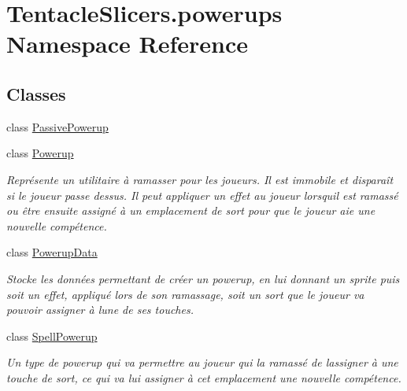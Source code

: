 \hypertarget{namespace_tentacle_slicers_1_1powerups}{}\section{Tentacle\+Slicers.\+powerups Namespace Reference}
\label{namespace_tentacle_slicers_1_1powerups}
\subsection*{Classes}
\begin{DoxyCompactItemize}
\item 
class \hyperlink{class_tentacle_slicers_1_1powerups_1_1_passive_powerup}{Passive\+Powerup}
\item 
class \hyperlink{class_tentacle_slicers_1_1powerups_1_1_powerup}{Powerup}
\begin{DoxyCompactList}\small\item\em Représente un utilitaire à ramasser pour les joueurs. Il est immobile et disparaît si le joueur passe dessus. Il peut appliquer un effet au joueur lorsqu\textquotesingle{}il est ramassé ou être ensuite assigné à un emplacement de sort pour que le joueur aie une nouvelle compétence. \end{DoxyCompactList}\item 
class \hyperlink{class_tentacle_slicers_1_1powerups_1_1_powerup_data}{Powerup\+Data}
\begin{DoxyCompactList}\small\item\em Stocke les données permettant de créer un powerup, en lui donnant un sprite puis soit un effet, appliqué lors de son ramassage, soit un sort que le joueur va pouvoir assigner à l\textquotesingle{}une de ses touches. \end{DoxyCompactList}\item 
class \hyperlink{class_tentacle_slicers_1_1powerups_1_1_spell_powerup}{Spell\+Powerup}
\begin{DoxyCompactList}\small\item\em Un type de powerup qui va permettre au joueur qui l\textquotesingle{}a ramassé de l\textquotesingle{}assigner à une touche de sort, ce qui va lui assigner à cet emplacement une nouvelle compétence. \end{DoxyCompactList}\end{DoxyCompactItemize}
